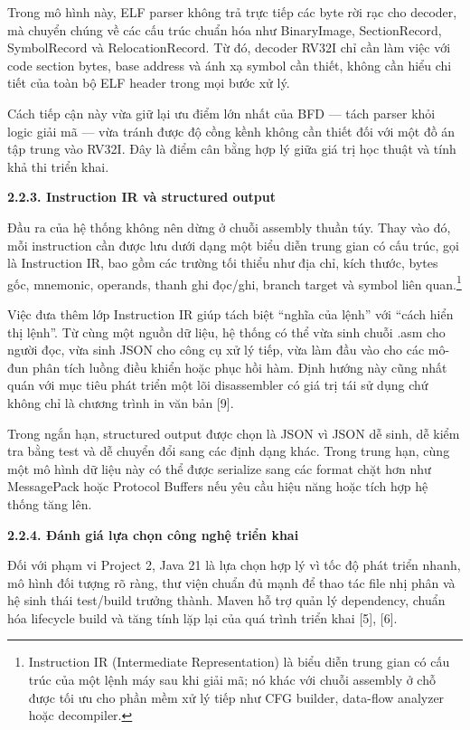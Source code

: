 \documentclass[
]{article}
\begin{document}
Trong mô hình này, ELF parser không trả trực tiếp các byte rời rạc cho
decoder, mà chuyển chúng về các cấu trúc chuẩn hóa như BinaryImage,
SectionRecord, SymbolRecord và RelocationRecord. Từ đó, decoder RV32I
chỉ cần làm việc với code section bytes, base address và ánh xạ symbol
cần thiết, không cần hiểu chi tiết của toàn bộ ELF header trong mọi bước
xử lý.

Cách tiếp cận này vừa giữ lại ưu điểm lớn nhất của BFD --- tách parser
khỏi logic giải mã --- vừa tránh được độ cồng kềnh không cần thiết đối
với một đồ án tập trung vào RV32I. Đây là điểm cân bằng hợp lý giữa giá
trị học thuật và tính khả thi triển khai.

\textbf{2.2.3. Instruction IR và structured output}

Đầu ra của hệ thống không nên dừng ở chuỗi assembly thuần túy. Thay vào
đó, mỗi instruction cần được lưu dưới dạng một biểu diễn trung gian có
cấu trúc, gọi là Instruction IR, bao gồm các trường tối thiểu như địa
chỉ, kích thước, bytes gốc, mnemonic, operands, thanh ghi đọc/ghi,
branch target và symbol liên quan.\footnote{Instruction IR (Intermediate
  Representation) là biểu diễn trung gian có cấu trúc của một lệnh máy
  sau khi giải mã; nó khác với chuỗi assembly ở chỗ được tối ưu cho phần
  mềm xử lý tiếp như CFG builder, data-flow analyzer hoặc decompiler.}

Việc đưa thêm lớp Instruction IR giúp tách biệt ``nghĩa của lệnh'' với
``cách hiển thị lệnh''. Từ cùng một nguồn dữ liệu, hệ thống có thể vừa
sinh chuỗi .asm cho người đọc, vừa sinh JSON cho công cụ xử lý tiếp, vừa
làm đầu vào cho các mô-đun phân tích luồng điều khiển hoặc phục hồi hàm.
Định hướng này cũng nhất quán với mục tiêu phát triển một lõi
disassembler có giá trị tái sử dụng chứ không chỉ là chương trình in văn
bản {[}9{]}.

Trong ngắn hạn, structured output được chọn là JSON vì JSON dễ sinh, dễ
kiểm tra bằng test và dễ chuyển đổi sang các định dạng khác. Trong trung
hạn, cùng một mô hình dữ liệu này có thể được serialize sang các format
chặt hơn như MessagePack hoặc Protocol Buffers nếu yêu cầu hiệu năng
hoặc tích hợp hệ thống tăng lên.

\textbf{2.2.4. Đánh giá lựa chọn công nghệ triển khai}

Đối với phạm vi Project 2, Java 21 là lựa chọn hợp lý vì tốc độ phát
triển nhanh, mô hình đối tượng rõ ràng, thư viện chuẩn đủ mạnh để thao
tác file nhị phân và hệ sinh thái test/build trưởng thành. Maven hỗ trợ
quản lý dependency, chuẩn hóa lifecycle build và tăng tính lặp lại của
quá trình triển khai {[}5{]}, {[}6{]}.
\end{document}
